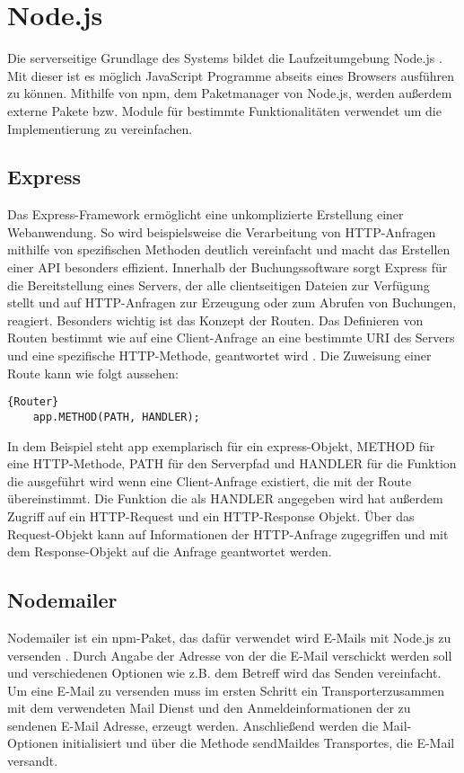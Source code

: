 \section{Node.js}
Die serverseitige Grundlage des Systems bildet die Laufzeitumgebung Node.js \cite{nodejs:listing}. Mit dieser ist es möglich JavaScript Programme abseits eines Browsers ausführen zu können. Mithilfe von \glqq npm\grqq, dem Paketmanager von Node.js, werden außerdem externe Pakete bzw. Module für bestimmte Funktionalitäten verwendet um die Implementierung zu vereinfachen.

\subsection{Express}
Das Express-Framework ermöglicht eine unkomplizierte Erstellung einer Webanwendung. So wird beispielsweise die Verarbeitung von HTTP-Anfragen mithilfe von spezifischen Methoden deutlich vereinfacht und macht das Erstellen einer API besonders effizient. Innerhalb der Buchungssoftware sorgt Express für die Bereitstellung eines Servers, der alle clientseitigen Dateien zur Verfügung stellt und auf HTTP-Anfragen zur Erzeugung oder zum Abrufen von Buchungen, reagiert. Besonders wichtig ist das Konzept der Routen. Das Definieren von Routen bestimmt wie auf eine Client-Anfrage an eine bestimmte URI des Servers und eine spezifische HTTP-Methode, geantwortet wird \cite{express:listing}. Die Zuweisung einer Route kann wie folgt aussehen: 
\begin{lstlisting}{Router}
	app.METHOD(PATH, HANDLER);
\end{lstlisting}
In dem Beispiel steht app exemplarisch für ein express-Objekt, METHOD für eine HTTP-Methode, PATH für den Serverpfad und HANDLER für die Funktion die ausgeführt wird wenn eine Client-Anfrage existiert, die mit der Route übereinstimmt. Die Funktion die als HANDLER angegeben wird hat außerdem Zugriff auf ein HTTP-Request und ein HTTP-Response Objekt. Über das Request-Objekt kann auf Informationen der HTTP-Anfrage zugegriffen und mit dem Response-Objekt auf die Anfrage geantwortet werden.


\subsection{Nodemailer}
Nodemailer ist ein \glqq npm\grqq-Paket, das dafür verwendet wird E-Mails mit Node.js zu versenden \cite{nodemailer:listing}. Durch Angabe der Adresse von der die E-Mail verschickt werden soll und verschiedenen Optionen wie z.B. dem Betreff wird das Senden vereinfacht. Um eine E-Mail zu versenden muss im ersten Schritt ein \glqq Transporter\grqq zusammen mit dem verwendeten Mail Dienst und den Anmeldeinformationen der zu sendenen E-Mail Adresse, erzeugt werden. Anschließend werden die Mail-Optionen initialisiert und über die Methode \glqq sendMail\grqq des Transportes, die E-Mail versandt.

